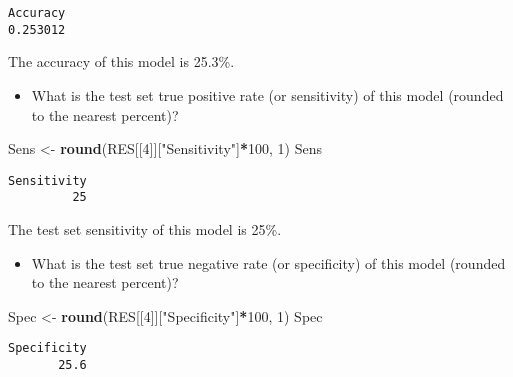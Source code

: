 \documentclass[]{book}
\newenvironment{Shaded}{\begin{snugshade}}{\end{snugshade}}
\newcommand{\KeywordTok}[1]{\textcolor[rgb]{0.13,0.29,0.53}{\textbf{#1}}}
\newcommand{\DecValTok}[1]{\textcolor[rgb]{0.00,0.00,0.81}{#1}}
\newcommand{\StringTok}[1]{\textcolor[rgb]{0.31,0.60,0.02}{#1}}
\newcommand{\OperatorTok}[1]{\textcolor[rgb]{0.81,0.36,0.00}{\textbf{#1}}}
\newcommand{\NormalTok}[1]{#1}
\providecommand{\tightlist}{%
  \setlength{\itemsep}{0pt}\setlength{\parskip}{0pt}}
\begin{document}
\begin{Shaded}
\end{Shaded}

\begin{verbatim}
Accuracy 
0.253012 
\end{verbatim}

The accuracy of this model is 25.3\%.

\begin{itemize}
\tightlist
\item
  What is the test set true positive rate (or sensitivity) of this model
  (rounded to the nearest percent)?
\end{itemize}

\begin{Shaded}
\begin{Highlighting}[]
\NormalTok{Sens <-}\StringTok{ }\KeywordTok{round}\NormalTok{(RES[[}\DecValTok{4}\NormalTok{]][}\StringTok{"Sensitivity"}\NormalTok{]}\OperatorTok{*}\DecValTok{100}\NormalTok{, }\DecValTok{1}\NormalTok{)}
\NormalTok{Sens}
\end{Highlighting}
\end{Shaded}

\begin{verbatim}
Sensitivity 
         25 
\end{verbatim}

The test set sensitivity of this model is 25\%.

\begin{itemize}
\tightlist
\item
  What is the test set true negative rate (or specificity) of this model
  (rounded to the nearest percent)?
\end{itemize}

\begin{Shaded}
\begin{Highlighting}[]
\NormalTok{Spec <-}\StringTok{ }\KeywordTok{round}\NormalTok{(RES[[}\DecValTok{4}\NormalTok{]][}\StringTok{"Specificity"}\NormalTok{]}\OperatorTok{*}\DecValTok{100}\NormalTok{, }\DecValTok{1}\NormalTok{)}
\NormalTok{Spec}
\end{Highlighting}
\end{Shaded}

\begin{verbatim}
Specificity 
       25.6 
\end{verbatim}
\end{document}
